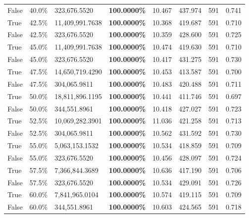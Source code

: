 \begin{table}[H]
\begin{tabular}{lllrllll}
\cline{1-8}
False & 40.0\% & 323,676.5520 & \bfseries \color{red} 100.0000\% & 10.467 & 437.974 & 591 & 0.741 \\
\cline{1-8}
True & 42.5\% & 11,409,991.7638 & \bfseries \color{red} 100.0000\% & 10.368 & 419.687 & 591 & 0.710 \\
\cline{1-8}
False & 42.5\% & 323,676.5520 & \bfseries \color{red} 100.0000\% & 10.359 & 428.600 & 591 & 0.725 \\
\cline{1-8}
True & 45.0\% & 11,409,991.7638 & \bfseries \color{red} 100.0000\% & 10.474 & 419.630 & 591 & 0.710 \\
\cline{1-8}
False & 45.0\% & 323,676.5520 & \bfseries \color{red} 100.0000\% & 10.417 & 431.275 & 591 & 0.730 \\
\cline{1-8}
True & 47.5\% & 14,650,719.4290 & \bfseries \color{red} 100.0000\% & 10.453 & 413.587 & 591 & 0.700 \\
\cline{1-8}
False & 47.5\% & 304,065.9811 & \bfseries \color{red} 100.0000\% & 10.483 & 420.488 & 591 & 0.711 \\
\cline{1-8}
True & 50.0\% & 18,811,896.1195 & \bfseries \color{red} 100.0000\% & 10.441 & 411.746 & 591 & 0.697 \\
\cline{1-8}
False & 50.0\% & 344,551.8961 & \bfseries \color{red} 100.0000\% & 10.418 & 427.027 & 591 & 0.723 \\
\cline{1-8}
True & 52.5\% & 10,069,282.3901 & \bfseries \color{red} 100.0000\% & 11.036 & 421.258 & 591 & 0.713 \\
\cline{1-8}
False & 52.5\% & 304,065.9811 & \bfseries \color{red} 100.0000\% & 10.562 & 431.592 & 591 & 0.730 \\
\cline{1-8}
True & 55.0\% & 5,063,153.1532 & \bfseries \color{red} 100.0000\% & 10.534 & 418.859 & 591 & 0.709 \\
\cline{1-8}
False & 55.0\% & 323,676.5520 & \bfseries \color{red} 100.0000\% & 10.456 & 428.097 & 591 & 0.724 \\
\cline{1-8}
True & 57.5\% & 7,366,844.3689 & \bfseries \color{red} 100.0000\% & 10.636 & 417.190 & 591 & 0.706 \\
\cline{1-8}
False & 57.5\% & 323,676.5520 & \bfseries \color{red} 100.0000\% & 10.534 & 429.091 & 591 & 0.726 \\
\cline{1-8}
True & 60.0\% & 7,841,965.0104 & \bfseries \color{red} 100.0000\% & 10.574 & 419.115 & 591 & 0.709 \\
\cline{1-8}
False & 60.0\% & 344,551.8961 & \bfseries \color{red} 100.0000\% & 10.603 & 424.565 & 591 & 0.718 \\

\end{tabular}
\end{table}
